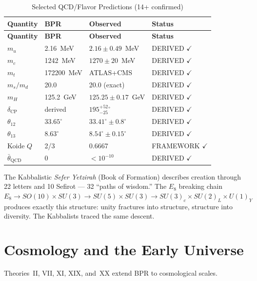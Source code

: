 \documentclass[12pt,oneside]{book}
\theoremstyle{definition}
\newcommand{\EEight}{E_8}
\begin{document}
\begin{longtable}{@{}llll@{}}
  \caption{Selected QCD/Flavor Predictions (14+ confirmed)}
  \label{tab:qcd-predictions}\\
  \toprule
  \textbf{Quantity} & \textbf{BPR} & \textbf{Observed} & \textbf{Status}\\
  \midrule\endfirsthead
  \midrule\textbf{Quantity} & \textbf{BPR} & \textbf{Observed} & \textbf{Status}\\
  \midrule\endhead
  $m_u$ & 2.16~MeV & $2.16\pm0.49$~MeV & DERIVED $\checkmark$\\
  $m_c$ & 1242~MeV & $1270\pm20$~MeV & DERIVED $\checkmark$\\
  $m_t$ & 172200~MeV & ATLAS+CMS & DERIVED $\checkmark$\\
  $m_s/m_d$ & 20.0 & 20.0 (exact) & DERIVED $\checkmark$\\
  $m_H$ & 125.2~GeV & $125.25\pm0.17$~GeV & DERIVED $\checkmark$\\
  $\delta_{\mathrm{CP}}$ & derived & $195^{+52}_{-25}{}^\circ$ & DERIVED $\checkmark$\\
  $\theta_{12}$ & $33.65^\circ$ & $33.41^\circ\pm0.8^\circ$ & DERIVED $\checkmark$\\
  $\theta_{13}$ & $8.63^\circ$ & $8.54^\circ\pm0.15^\circ$ & DERIVED $\checkmark$\\
  Koide $Q$ & 2/3 & 0.6667 & FRAMEWORK $\checkmark$\\
  $\bar{\theta}_{\mathrm{QCD}}$ & 0 & $<10^{-10}$ & DERIVED $\checkmark$\\
  \bottomrule
\end{longtable}

\begin{resonance}
The Kabbalistic \textit{Sefer Yetzirah} (Book of Formation) describes creation
through 22 letters and 10 Sefirot --- 32 ``paths of wisdom.'' The $\EEight$
breaking chain $E_8 \to SO(10)\times SU(3) \to SU(5)\times SU(3) \to
SU(3)_c\times SU(2)_L\times U(1)_Y$ produces exactly this structure: unity
fractures into structure, structure into diversity. The Kabbalists traced the
same descent.
\end{resonance}

\chapter{Cosmology and the Early Universe}
\label{chap:cosmology}

Theories~II, VII, XI, XIX, and~XX extend BPR to cosmological scales.
\end{document}
